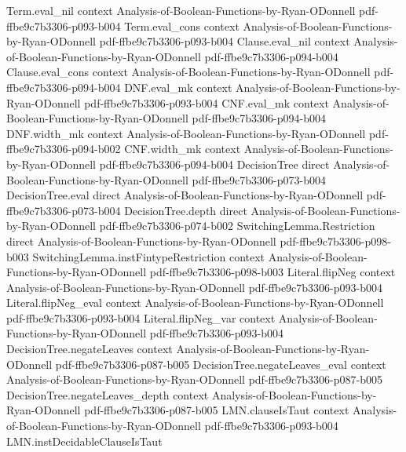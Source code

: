 \begin{lemma}
  {Term.eval_nil}
  {context}
  {Analysis-of-Boolean-Functions-by-Ryan-ODonnell}
  {pdf-ffbe9c7b3306-p093-b004}
\proofstep
  {Term.eval_cons}
  {context}
  {Analysis-of-Boolean-Functions-by-Ryan-ODonnell}
  {pdf-ffbe9c7b3306-p093-b004}
\proofstep
  {Clause.eval_nil}
  {context}
  {Analysis-of-Boolean-Functions-by-Ryan-ODonnell}
  {pdf-ffbe9c7b3306-p094-b004}
\proofstep
  {Clause.eval_cons}
  {context}
  {Analysis-of-Boolean-Functions-by-Ryan-ODonnell}
  {pdf-ffbe9c7b3306-p094-b004}
\proofstep
  {DNF.eval_mk}
  {context}
  {Analysis-of-Boolean-Functions-by-Ryan-ODonnell}
  {pdf-ffbe9c7b3306-p093-b004}
\proofstep
  {CNF.eval_mk}
  {context}
  {Analysis-of-Boolean-Functions-by-Ryan-ODonnell}
  {pdf-ffbe9c7b3306-p094-b004}
\proofstep
  {DNF.width_mk}
  {context}
  {Analysis-of-Boolean-Functions-by-Ryan-ODonnell}
  {pdf-ffbe9c7b3306-p094-b002}
\proofstep
  {CNF.width_mk}
  {context}
  {Analysis-of-Boolean-Functions-by-Ryan-ODonnell}
  {pdf-ffbe9c7b3306-p094-b004}
\proofstep
  {DecisionTree}
  {direct}
  {Analysis-of-Boolean-Functions-by-Ryan-ODonnell}
  {pdf-ffbe9c7b3306-p073-b004}
\proofstep
  {DecisionTree.eval}
  {direct}
  {Analysis-of-Boolean-Functions-by-Ryan-ODonnell}
  {pdf-ffbe9c7b3306-p073-b004}
\proofstep
  {DecisionTree.depth}
  {direct}
  {Analysis-of-Boolean-Functions-by-Ryan-ODonnell}
  {pdf-ffbe9c7b3306-p074-b002}
\proofstep
  {SwitchingLemma.Restriction}
  {direct}
  {Analysis-of-Boolean-Functions-by-Ryan-ODonnell}
  {pdf-ffbe9c7b3306-p098-b003}
\proofstep
  {SwitchingLemma.instFintypeRestriction}
  {context}
  {Analysis-of-Boolean-Functions-by-Ryan-ODonnell}
  {pdf-ffbe9c7b3306-p098-b003}
\proofstep
  {Literal.flipNeg}
  {context}
  {Analysis-of-Boolean-Functions-by-Ryan-ODonnell}
  {pdf-ffbe9c7b3306-p093-b004}
\proofstep
  {Literal.flipNeg_eval}
  {context}
  {Analysis-of-Boolean-Functions-by-Ryan-ODonnell}
  {pdf-ffbe9c7b3306-p093-b004}
\proofstep
  {Literal.flipNeg_var}
  {context}
  {Analysis-of-Boolean-Functions-by-Ryan-ODonnell}
  {pdf-ffbe9c7b3306-p093-b004}
\proofstep
  {DecisionTree.negateLeaves}
  {context}
  {Analysis-of-Boolean-Functions-by-Ryan-ODonnell}
  {pdf-ffbe9c7b3306-p087-b005}
\proofstep
  {DecisionTree.negateLeaves_eval}
  {context}
  {Analysis-of-Boolean-Functions-by-Ryan-ODonnell}
  {pdf-ffbe9c7b3306-p087-b005}
\proofstep
  {DecisionTree.negateLeaves_depth}
  {context}
  {Analysis-of-Boolean-Functions-by-Ryan-ODonnell}
  {pdf-ffbe9c7b3306-p087-b005}
\proofstep
  {LMN.clauseIsTaut}
  {context}
  {Analysis-of-Boolean-Functions-by-Ryan-ODonnell}
  {pdf-ffbe9c7b3306-p093-b004}
\proofstep
  {LMN.instDecidableClauseIsTaut}

\end{lemma}
